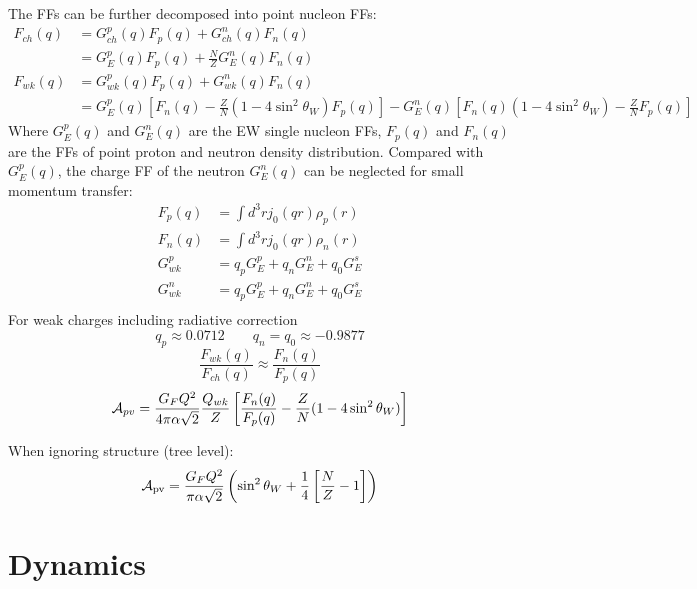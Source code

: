 The FFs can be further decomposed into point nucleon FFs:
\begin{equation*}
    \begin{aligned}
	F_{ch}(q) &= G_{ch}^p(q)F_p(q) + G_{ch}^n(q)F_n(q)  \\
		  &= G_E^p(q)F_p(q) + \frac{N}{Z}G_E^n(q)F_n(q)	\\
	F_{wk}(q) &= G_{wk}^p(q)F_p(q) + G_{wk}^n(q)F_n(q)  \\
		  &= G_E^p(q)\left[ F_n(q) - \frac{Z}{N}(1-4\sin^2\theta_W)F_p(q)\right] - G_E^n(q)\left[ F_n(q)(1-4\sin^2\theta_W) - \frac{Z}{N}F_p(q)\right]
    \end{aligned}
\end{equation*}
Where $G_E^p(q)$ and $G_E^n(q)$ are the EW single nucleon FFs, 
$F_p(q)$ and $F_n(q)$ are the FFs of point proton and neutron density distribution. 
Compared with $G_E^p(q)$, the charge FF of the neutron $G_E^n(q)$ can be neglected for small momentum transfer:
\begin{equation*}
    \begin{aligned}
	F_p(q) &= \int d^3r j_0(qr) \rho_p(r)	\\
	F_n(q) &= \int d^3r j_0(qr) \rho_n(r)	\\
	G_{wk}^p &= q_p G_E^p + q_n G_E^n + q_0 G_E^s	\\
	G_{wk}^n &= q_p G_E^p + q_n G_E^n + q_0 G_E^s	\\
    \end{aligned}
\end{equation*}
For weak charges including radiative correction
$$ q_p \approx 0.0712	\qquad q_n = q_0 \approx -0.9877 $$
$$ \frac{F_{wk}(q)}{F_{ch}(q)} \approx \frac{F_n(q)}{F_p(q)}$$
$$ \mathcal{A}_{pv} = \frac{G_FQ^2}{4\pi\alpha\sqrt{2}}\frac{Q_{wk}}{Z}\left[ \frac{F_n(q)}{F_p(q)} - \frac{Z}{N}(1-4\sin^2\theta_W) \right]$$

\bigskip
When ignoring structure (tree level):
\begin{equation*}
    \mathcal{A}_{\text{pv}} = \frac{G_F Q^2}{\pi\alpha\sqrt{2}} \left(\sin^2\theta_W + \frac{1}{4}\left[ \frac{N}{Z} - 1 \right] \right)
\end{equation*}

\section{Dynamics}
\begin{center}
\end{center}

